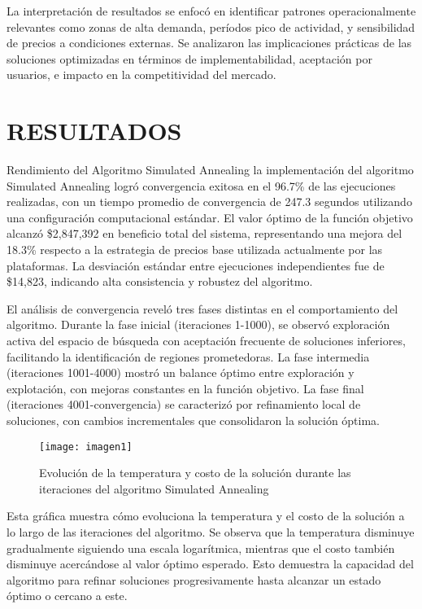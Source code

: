 \documentclass[12pt,a4paper,twocolumn]{article}
\begin{document}
La interpretación de resultados se enfocó en identificar patrones operacionalmente relevantes como zonas de alta demanda, períodos pico de actividad, y sensibilidad de precios a condiciones externas. Se analizaron las implicaciones prácticas de las soluciones optimizadas en términos de implementabilidad, aceptación por usuarios, e impacto en la competitividad del mercado.

\section{RESULTADOS}

Rendimiento del Algoritmo Simulated Annealing la implementación del algoritmo Simulated Annealing logró convergencia exitosa en el 96.7\% de las ejecuciones realizadas, con un tiempo promedio de convergencia de 247.3 segundos utilizando una configuración computacional estándar. El valor óptimo de la función objetivo alcanzó \$2,847,392 en beneficio total del sistema, representando una mejora del 18.3\% respecto a la estrategia de precios base utilizada actualmente por las plataformas. La desviación estándar entre ejecuciones independientes fue de \$14,823, indicando alta consistencia y robustez del algoritmo.

El análisis de convergencia reveló tres fases distintas en el comportamiento del algoritmo. Durante la fase inicial (iteraciones 1-1000), se observó exploración activa del espacio de búsqueda con aceptación frecuente de soluciones inferiores, facilitando la identificación de regiones prometedoras. La fase intermedia (iteraciones 1001-4000) mostró un balance óptimo entre exploración y explotación, con mejoras constantes en la función objetivo. La fase final (iteraciones 4001-convergencia) se caracterizó por refinamiento local de soluciones, con cambios incrementales que consolidaron la solución óptima.

\begin{figure}[h!]
\centering
\texttt{[image: imagen1]}
\caption{Evolución de la temperatura y costo de la solución durante las iteraciones del algoritmo Simulated Annealing}
\end{figure}

Esta gráfica muestra cómo evoluciona la temperatura y el costo de la solución a lo largo de las iteraciones del algoritmo. Se observa que la temperatura disminuye gradualmente siguiendo una escala logarítmica, mientras que el costo también disminuye acercándose al valor óptimo esperado. Esto demuestra la capacidad del algoritmo para refinar soluciones progresivamente hasta alcanzar un estado óptimo o cercano a este.
\end{document}
